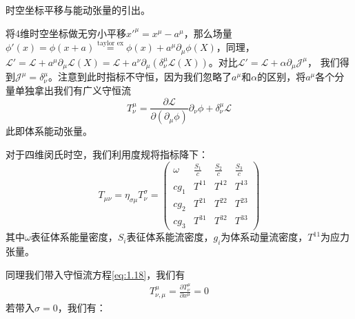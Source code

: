 \documentclass[../main.tex]{subfiles}
\begin{document}
\begin{example}{时空坐标平移与能动张量的引出。}

    将4维时空坐标做无穷小平移$x'^{\mu} = x^{\mu} - a^{\mu}$，那么场量$\phi'(x) = \phi(x+a) \overset{\text{taylor ex}}{=} \phi(x) + a^{\mu}\partial_{\mu}\phi(X) $，同理，
    $\mathcal{L}' = \mathcal{L} + a^{\mu}\partial_{\mu}\mathcal{L}(X) = \mathcal{L} + a^{\nu}\partial_{\mu}(\delta^{\mu}_{\nu}\mathcal{L}(X)) $。对比$\mathcal{L}' = \mathcal{L} + \alpha\partial_{\mu}\mathcal{J}^{\mu}$，
    我们得到$\mathcal{J}^{\mu} = \delta^{\mu}_{\nu}$。注意到此时指标不守恒，因为我们忽略了$a^{\mu}$和$\alpha$的区别，将$a^{\mu}$各个分量单独拿出我们有广义守恒流
    \begin{equation}
        T^{\mu}_{\nu} = \frac{\partial\mathcal{L}}{\partial(\partial_{\mu}\phi)} \partial_{\nu}\phi + \delta^{\mu}_{\nu}\mathcal{L}
    \end{equation}
    此即体系能动张量。

    对于四维闵氏时空，我们利用度规将指标降下：
    \begin{equation}
        T_{\mu\nu} = \eta_{\sigma \mu} T^{\sigma}_{\nu} = \begin{pmatrix}
            \omega & \frac{S_1}{c} & \frac{S_2}{c} & \frac{S_3}{c} \\
            cg_{1} & T^{11} & T^{12} & T^{13} \\
            cg_{2} & T^{21} & T^{22} & T^{23} \\
            cg_{3} & T^{31} & T^{32} & T^{33}
        \end{pmatrix}
    \end{equation}
    其中$\omega$表征体系能量密度，$S_i$表征体系能流密度，$g_i$为体系动量流密度，$T^{11}$为应力张量。

    同理我们带入守恒流方程\eqref{eq:1.18}，我们有
    \begin{eqnarray}
        T^{\mu}_{\nu,\mu} = \frac{\partial T^{\mu}_{\nu}}{\partial x^{\mu}} = 0 %
    \end{eqnarray}
    若带入$\sigma = 0$，我们有：
\end{example}
\end{document}
